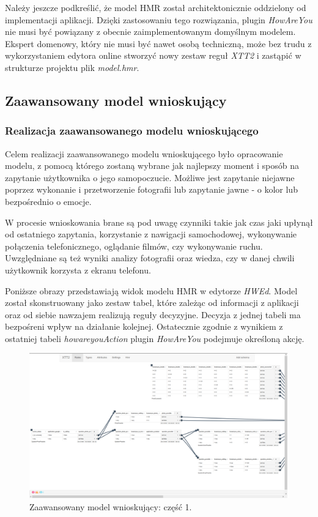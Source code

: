 Należy jeszcze podkreślić, że model HMR został architektonicznie oddzielony od implementacji aplikacji. Dzięki zastosowaniu tego rozwiązania, plugin \textit{HowAreYou} nie musi być powiązany z obecnie zaimplementowanym domyślnym modelem. Ekspert domenowy, który nie musi być nawet osobą techniczną, może bez trudu z wykorzystaniem edytora online stworzyć nowy zestaw reguł \textit{XTT2} i zastąpić w strukturze projektu plik \textit{model.hmr}.

\subsection{Zaawansowany model wnioskujący}

\subsubsection{Realizacja zaawansowanego modelu wnioskującego}

Celem realizacji zaawansowanego modelu wnioskującego było opracowanie modelu, z pomocą którego zostaną wybrane jak najlepszy moment i sposób na zapytanie użytkownika o jego samopoczucie. Możliwe jest zapytanie niejawne poprzez wykonanie i przetworzenie fotografii lub zapytanie jawne - o kolor lub bezpośrednio o emocje.

W procesie wnioskowania brane są pod uwagę czynniki takie jak czas jaki upłynął od ostatniego zapytania, korzystanie z nawigacji samochodowej, wykonywanie połączenia telefonicznego, oglądanie filmów, czy wykonywanie ruchu. Uwzględniane są też wyniki analizy fotografii oraz wiedza, czy w danej chwili użytkownik korzysta z ekranu telefonu.

Poniższe obrazy przedstawiają widok modelu HMR w edytorze \textit{HWEd}. Model został skonstruowany jako zestaw tabel, które zależąc od informacji z aplikacji oraz od siebie nawzajem realizują reguły decyzyjne. Decyzja z jednej tabeli ma bezpośreni wpływ na działanie kolejnej. Ostatecznie zgodnie z wynikiem z ostatniej tabeli \textit{howareyouAction} plugin \textit{HowAreYou} podejmuje określoną akcję.

\begin{figure}[H]
	\centering
	\includegraphics[scale=0.8]{rozdzial4/HMR_advancedModelPart1.png}
	\caption{Zaawansowany model wnioskujący: część 1.}
\end{figure}


